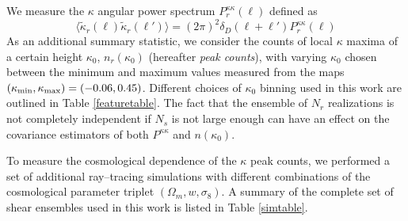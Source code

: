 \documentclass[reprint,aps,prd,superscriptaddress,showkeys,showpacs]{revtex4-1}
\begin{document}
We measure the $\kappa$ angular power spectrum $P^{\kappa\kappa}_r(\ell)$ defined as
\begin{equation}
\langle\tilde{\kappa}_r(\pmb{\ell})\tilde{\kappa}_r(\pmb{\ell}')\rangle = (2\pi)^2\delta_D(\pmb{\ell}+\pmb{\ell}')P^{\kappa\kappa}_r(\ell)
\end{equation}
%
As an additional summary statistic, we consider the counts of local
$\kappa$ maxima of a certain height $\kappa_0$, $n_r(\kappa_0)$
(hereafter \textit{peak counts}), with varying $\kappa_0$ chosen
between the minimum and maximum values measured from the maps
$(\kappa_{\rm min},\kappa_{\rm max})=(-0.06,0.45)$. Different choices
of $\kappa_0$ binning used in this work are outlined in Table
\ref{featuretable}.  The fact that the ensemble of $N_r$ realizations
is not completely independent if $N_s$ is not large enough can have an
effect on the covariance estimators of both $P^{\kappa\kappa}$ and
$n(\kappa_0)$.

To measure the cosmological dependence of the $\kappa$ peak counts, we
performed a set of additional ray--tracing simulations with different
combinations of the cosmological parameter triplet
$(\Omega_m,w,\sigma_8)$. A summary of the complete set of shear
ensembles used in this work is listed in Table \ref{simtable}.
\end{document}
